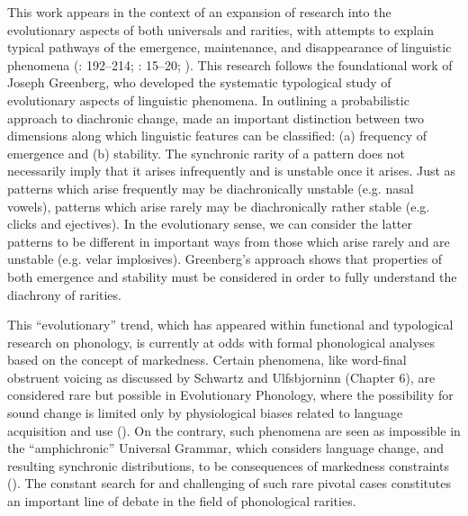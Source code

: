 \documentclass[output=paper]{langscibook}
\begin{document}
This work appears in the context of an expansion of research into the evolutionary aspects of both universals and rarities, with attempts to explain typical pathways of the emergence, maintenance, and disappearance of linguistic phenomena (\citealt{Blevins2004}: 192–214; \citealt{SimonWiese2011}: 15–20; \citealt{Round2019}). This research follows the foundational work of Joseph Greenberg, who developed the systematic typological study of evolutionary aspects of linguistic phenomena. In outlining a probabilistic approach to diachronic change, \citet{Greenberg1978} made an important distinction between two dimensions along which linguistic features can be classified: (a) frequency of emergence and (b) stability. The synchronic rarity of a pattern does not necessarily imply that it arises infrequently and is unstable once it arises. Just as patterns which arise frequently may be diachronically unstable (e.g. nasal vowels), patterns which arise rarely may be diachronically rather stable (e.g. clicks and ejectives). In the evolutionary sense, we can consider the latter patterns to be different in important ways from those which arise rarely and are unstable (e.g. velar implosives). Greenberg's approach shows that properties of both emergence and stability must be considered in order to fully understand the diachrony of rarities.

This “evolutionary” trend, which has appeared within functional and typological research on phonology, is currently at odds with formal phonological analyses based on the concept of markedness. Certain phenomena, like word-final obstruent voicing as discussed by Schwartz and Ulfsbjorninn (Chapter 6), are considered rare but possible in Evolutionary Phonology, where the possibility for sound change is limited only by physiological biases related to language acquisition and use (\citealt{Blevins2006a,Blevins2006b,EgurtzegiUllrich2020}). On the contrary, such phenomena are seen as impossible in the “amphichronic” Universal Grammar, which considers language change, and resulting synchronic distributions, to be consequences of markedness constraints (\citealt{Kiparsky2006,Kiparsky2008}). The constant search for and challenging of such rare pivotal cases constitutes an important line of debate in the field of phonological rarities.
\end{document}
